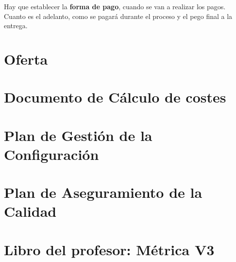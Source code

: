 \documentclass[12pt]{report} %
\begin{document}
Hay que establecer la \textbf{forma de pago}, cuando se van a realizar
los pagos. Cuanto es el adelanto, como se pagará durante el proceso y el
pego final a la entrega.

\part{Oferta}


\part{Documento de Cálculo de costes}


\part{Plan de Gestión de la Configuración}


\part{Plan de Aseguramiento de la Calidad}


\part{Libro del profesor: Métrica V3}

\end{document}
